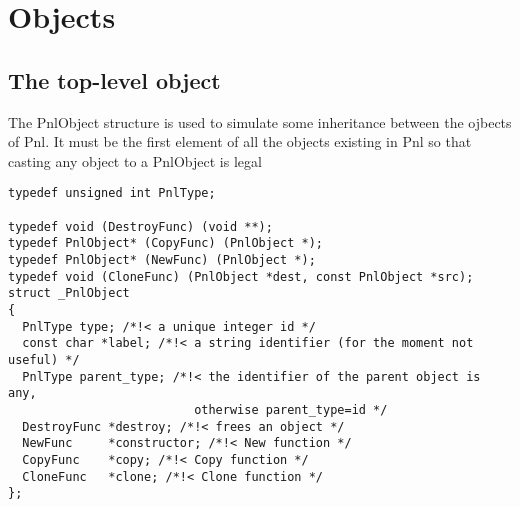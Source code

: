 \section{Objects}

\subsection{The top-level object}

The PnlObject structure is used to simulate some inheritance between the
ojbects of Pnl.  It must be the first element of all the objects existing in
Pnl so that casting any object to a PnlObject is legal

\begin{verbatim}
typedef unsigned int PnlType; 

typedef void (DestroyFunc) (void **);
typedef PnlObject* (CopyFunc) (PnlObject *);
typedef PnlObject* (NewFunc) (PnlObject *);
typedef void (CloneFunc) (PnlObject *dest, const PnlObject *src);
struct _PnlObject
{
  PnlType type; /*!< a unique integer id */
  const char *label; /*!< a string identifier (for the moment not useful) */
  PnlType parent_type; /*!< the identifier of the parent object is any,
                          otherwise parent_type=id */
  DestroyFunc *destroy; /*!< frees an object */
  NewFunc     *constructor; /*!< New function */
  CopyFunc    *copy; /*!< Copy function */
  CloneFunc   *clone; /*!< Clone function */
};
\end{verbatim}

